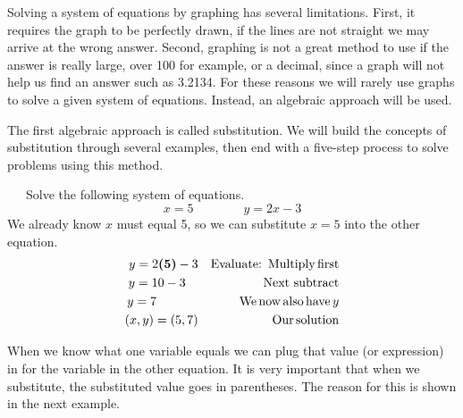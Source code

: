 {}\pp

Solving a system of equations by graphing has several limitations. First, it requires
the graph to be perfectly drawn, if the lines are not straight we may arrive
at the wrong answer. Second, graphing is not a great method to use if the
answer is really large, over 100 for example, or a decimal, since
a graph will not help us find an answer such as 3.2134. For these reasons we
will rarely use graphs to solve a given system of equations. Instead, an algebraic approach
will be used.\pp

The first algebraic approach is called substitution. We will build the
concepts of substitution through several examples, then end with a five-step
process to solve problems using this method.

\begin{example}~~~Solve the following system of equations.
$$x=5\qquad\qquad y=2x-3$$
We already know $x$ must equal 5, so we can substitute $x=5$ into the other equation.%
\begin{eqnarray*}
		y = 2 \boldsymbol{(5)} - 3 &  & \operatorname{Evaluate:} \operatorname{~Multiply}
    \operatorname{first}\\
    y = 10 - 3~~~ &  & \operatorname{Next~subtract}\\
    y = 7~~~~~~~~~~ &  & \operatorname{We} \operatorname{now} \operatorname{also} \operatorname{have} y\\
    (x,y)=(5, 7) &  & \operatorname{Our} \operatorname{solution}
  \end{eqnarray*}
\end{example}

When we know what one variable equals we can plug that value (or expression)
in for the variable in the other equation. It is very important that when we
substitute, the substituted value goes in parentheses. The reason for this is
shown in the next example.%

